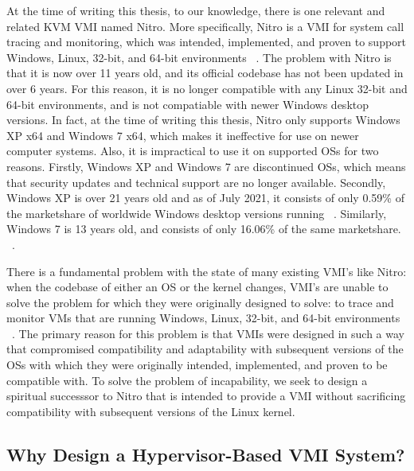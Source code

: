 \documentclass{report}
\begin{document}
\begin{spacing}{1.5}
{\large
\noindent At the time of writing this thesis, to our knowledge, there is one relevant and related KVM VMI named Nitro. More specifically, Nitro is a VMI for system call tracing and monitoring, which was intended, implemented, and proven to support Windows, Linux, 32-bit, and 64-bit environments ~\cite{10.1007/978-3-642-25141-2_7}. The problem with Nitro is that it is now over 11 years old, and its official codebase has not been updated in over 6 years. For this reason, it is no longer compatible with any Linux 32-bit and 64-bit environments, and is not compatiable with newer Windows desktop versions. In fact, at the time of writing this thesis, Nitro only supports Windows XP x64 and Windows 7 x64, which makes it ineffective for use on newer computer systems. Also, it is impractical to use it on supported OSs for two reasons. Firstly, Windows XP and Windows 7 are discontinued OSs, which means that security updates and technical support are no longer available. Secondly, Windows XP is over 21 years old and as of July 2021, it consists of only 0.59\% of the marketshare of worldwide Windows desktop versions running ~\cite{luo2022teaching}. Similarly, Windows 7 is 13 years old, and consists of only 16.06\% of the same marketshare. ~\cite{luo2022teaching}. 
\newline
}

{\large
\noindent There is a fundamental problem with the state of many existing VMI's like Nitro: when the codebase of either an OS or the kernel changes, VMI's are unable to solve the problem for which they were originally designed to solve: to trace and monitor VMs that are running Windows, Linux, 32-bit, and 64-bit environments ~\cite{win2014virtual}. The primary reason for this problem is that VMIs were designed in such a way that compromised compatibility and adaptability with subsequent versions of the OSs with which they were originally intended, implemented, and proven to be compatible with. To solve the problem of incapability, we seek to design a spiritual successsor to Nitro that is intended to provide a VMI without sacrificing compatibility with subsequent versions of the Linux kernel.
\newline
}









\subsection{Why Design a Hypervisor-Based VMI System?}


\end{spacing}
\end{document}
